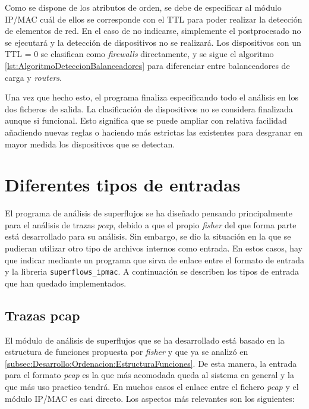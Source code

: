 \documentclass[tfg,epsbased,lof,lot,loa,covers,final,copyright,overleaf]{tfgtfmthesisuam}
\begin{document}
Como se dispone de los atributos de orden, se debe de especificar al módulo IP/MAC cuál de ellos se corresponde con el TTL para poder realizar la detección de elementos de red. En el caso de no indicarse, simplemente el postprocesado no se ejecutará y la detección de dispositivos no se realizará. Los dispositivos con un TTL = 0 se clasifican como \textit{firewalls} directamente, y se sigue el algoritmo \ref{lst:AlgoritmoDeteccionBalanceadores} para diferenciar entre balanceadores de carga y \textit{routers}.

Una vez que hecho esto, el programa finaliza especificando todo el análisis en los dos ficheros de salida. La clasificación de dispositivos no se considera finalizada aunque si funcional. Esto significa que se puede ampliar con relativa facilidad añadiendo nuevas reglas o haciendo más estrictas las existentes para desgranar en mayor medida los dispositivos que se detectan.


\section{Diferentes tipos de entradas}
El programa de análisis de superflujos se ha diseñado pensando principalmente para el análisis de trazas \textit{pcap}, debido a que el propio \textit{fisher} del que forma parte está desarrollado para su análisis. Sin embargo, se dio la situación en la que se pudieran utilizar otro tipo de archivos internos como entrada. En estos casos, hay que indicar mediante un programa que sirva de enlace entre el formato de entrada y la libreria \texttt{superflows\_ipmac}. A continuación se describen los tipos de entrada que han quedado implementados.

\subsection{Trazas pcap}
El módulo de análisis de superflujos que se ha desarrollado está basado en la estructura de funciones propuesta por \textit{fisher} y que ya se analizó en \ref{subsec:Desarrollo:Ordenacion:EstructuraFunciones}. De esta manera, la entrada para el formato \textit{pcap} es la que más acomodada queda al sistema en general y la que más uso practico tendrá. En muchos casos el enlace entre el fichero \textit{pcap} y el módulo IP/MAC es casi directo. Los aspectos más relevantes son los siguientes:
\end{document}
